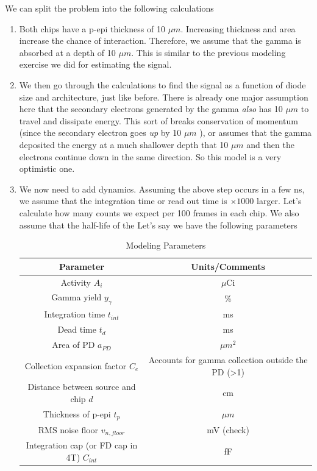 \documentclass{article}
\begin{document}
We can split the problem into the following calculations

\begin{enumerate}
    \item Both chips have a p-epi thickness of 10 $\mu m$. Increasing thickness and area increase the chance of interaction. Therefore, we assume that the gamma
    is absorbed at a depth of 10 $\mu m$. This is similar to the previous modeling exercise we did for estimating the signal.
    \item We then go through the calculations to find the signal as a function of diode size and architecture, just like before. There is already one major assumption here that
    the secondary electrons generated by the gamma \textit{also} has 10 $\mu m$ to travel and dissipate energy. This sort of breaks conservation of momentum (since the secondary electron 
    goes \textit{up} by 10 $\mu m$ ), or assumes that the gamma deposited the energy at a much shallower depth that 10 $\mu m$ and then the electrons continue down in the same direction. So this model
    is a very optimistic one.
    \item We now need to add dynamics. Assuming the above step occurs in a few ns, we assume that the integration time or read out time is $\times 1000$ larger. Let's calculate how many counts we expect per 100 frames 
    in each chip. We also assume that the half-life of the  Let's say we have the following parameters
    
    \begin{table}[H]
        \begin{center}
        
        \caption{Modeling Parameters}
        \begin{tabular}{|c|c|} \hline
            \textbf{Parameter} & \textbf{Units/Comments} \\ \hline
            Activity $A_i$ & $\mu$Ci \\ \hline
            Gamma yield $y_\gamma$ & \% \\ \hline
            Integration time $t_{int}$ & ms \\ \hline
            Dead time $t_d$ & ms \\ \hline
            Area of PD $a_{PD}$ & $\mu m^2$ \\ \hline
            Collection expansion factor $C_e$ & Accounts for gamma collection outside the PD (>1) \\ \hline
            Distance between source and chip $d$ & cm \\ \hline
            Thickness of p-epi $t_p$ & $\mu m$ \\ \hline
            RMS noise floor $v_{n,floor}$ & mV (check) \\ \hline
            Integration cap (or FD cap in 4T) $C_{int}$ & fF \\ \hline


\end{tabular}
\end{center}
\end{table}
\end{enumerate}
\end{document}
